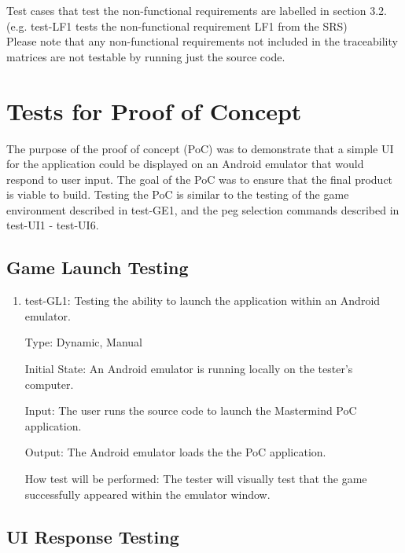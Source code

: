 \documentclass[12pt, titlepage]{article}
\begin{document}
Test cases that test the non-functional requirements are labelled in section 3.2. (e.g. test-LF1 tests the non-functional requirement LF1 from the SRS)\\

Please note that any non-functional requirements not included in the traceability matrices are not testable by running just the source code.

\section{Tests for Proof of Concept}
The purpose of the proof of concept (PoC) was to demonstrate that a simple UI for the application could be displayed on an Android emulator that would respond to user input. The goal of the PoC was to ensure that the final product is viable to build. Testing the PoC is similar to the testing of the game environment described in test-GE1, and the peg selection commands described in test-UI1 - test-UI6.

\subsection{Game Launch Testing}

\begin{enumerate}

\item test-GL1: Testing the ability to launch the application within an Android emulator.

Type: Dynamic, Manual

Initial State: An Android emulator is running locally on the tester's computer.

Input: The user runs the source code to launch the Mastermind PoC application.

Output: The Android emulator loads the the PoC application.

How test will be performed: The tester will visually test that the game successfully appeared within the emulator window.


\end{enumerate}

\subsection{UI Response Testing}
\end{document}
